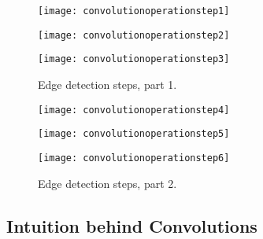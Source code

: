 	\begin{figure}[tbp]
		\begin{minipage}[t]{\textwidth}
			\begin{minipage}[t]{\textwidth}
				\centering
				\texttt{[image: convolutionoperationstep1]}
				\label{fig:convolutionoperationstep1}
			\end{minipage}
			\begin{minipage}[t]{\textwidth}
				\centering
				\texttt{[image: convolutionoperationstep2]}
				\label{fig:convolutionoperationstep2}
			\end{minipage}
			\begin{minipage}[t]{\textwidth}
				\centering
				\texttt{[image: convolutionoperationstep3]}
				\label{fig:convolutionoperationstep3}
			\end{minipage}
		\end{minipage}
		\caption{Edge detection steps, part 1.}
		\label{fig:convolutionoperationstepsa}
	\end{figure}

	\begin{figure}[tbp]
		\begin{minipage}[t]{\textwidth}
			\begin{minipage}[t]{\textwidth}
				\centering
				\texttt{[image: convolutionoperationstep4]}
				\label{fig:convolutionoperationstep4}
			\end{minipage}
			\begin{minipage}[t]{\textwidth}
				\centering
				\texttt{[image: convolutionoperationstep5]}
				\label{fig:convolutionoperationstep5}
			\end{minipage}
			\begin{minipage}[t]{\textwidth}
				\centering
				\texttt{[image: convolutionoperationstep6]}
				\label{fig:convolutionoperationstep6}
			\end{minipage}
		\end{minipage}
		\caption{Edge detection steps, part 2.}
		\label{fig:convolutionoperationstepsb}
	\end{figure}

	\subsection{Intuition behind Convolutions}


